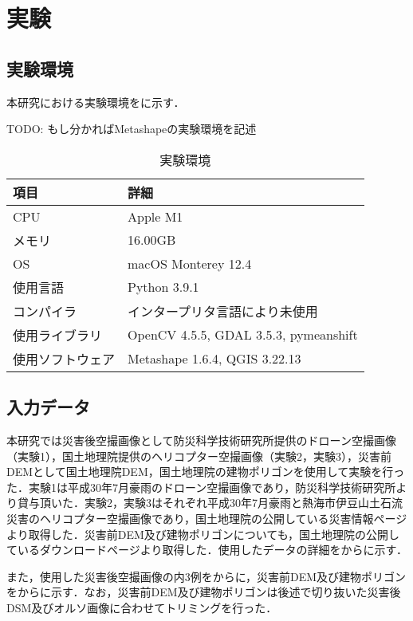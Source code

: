 \chapter{実験}
  \section{実験環境}
    本研究における実験環境をに示す．

    TODO: もし分かればMetashapeの実験環境を記述

    \begin{table}[t]
      \centering
      \caption{実験環境}
      \label{実験環境}
      \begin{tabular}{ll}
        \hline
        項目 & 詳細 \\
        \hline \hline
        CPU & Apple M1 \\
        メモリ & 16.00GB \\
        OS & macOS Monterey 12.4 \\
        使用言語 & Python 3.9.1 \\
        コンパイラ & インタープリタ言語により未使用 \\
        使用ライブラリ & OpenCV 4.5.5, GDAL 3.5.3, pymeanshift\cite{PyMeanShift} \\ 
        使用ソフトウェア & Metashape 1.6.4, QGIS 3.22.13 \\ \hline 
      \end{tabular}
    \end{table}


  \section{入力データ}
    \label{入力データ（実験）}
    本研究では災害後空撮画像として防災科学技術研究所提供のドローン空撮画像\cite{防災科研空撮画像}（実験1），国土地理院提供のヘリコプター空撮画像\cite{国土地理院空撮画像1,国土地理院空撮画像2}（実験2，実験3），災害前DEMとして国土地理院DEM，国土地理院の建物ポリゴンを使用して実験を行った．実験1は平成30年7月豪雨のドローン空撮画像であり，防災科学技術研究所より貸与頂いた．実験2，実験3はそれぞれ平成30年7月豪雨と熱海市伊豆山土石流災害のヘリコプター空撮画像であり，国土地理院の公開している災害情報ページより取得した．災害前DEM及び建物ポリゴンについても，国土地理院の公開しているダウンロードページより取得した．使用したデータの詳細をからに示す．

    また，使用した災害後空撮画像の内3例をからに，災害前DEM及び建物ポリゴンをからに示す．なお，災害前DEM及び建物ポリゴンは後述で切り抜いた災害後DSM及びオルソ画像に合わせてトリミングを行った．

